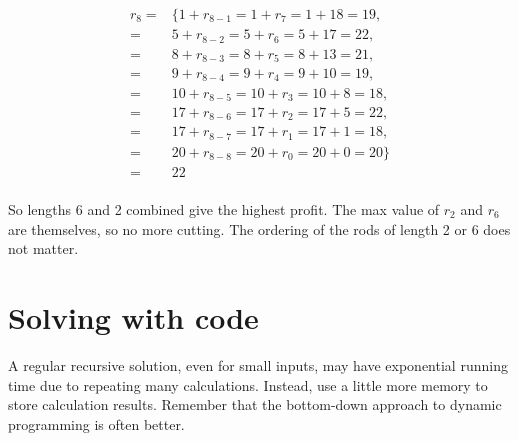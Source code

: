 \documentclass[12pt]{article}
\begin{document}
\begin{equation*} \label{rc8}
\begin{split}
r_8 = & \{ 1+r_{8-1} =1+r_7 = 1+18 =19,\\
    = & 5+r_{8-2} =5+r_6 = 5+17 =22,\\
    = & 8+r_{8-3} =8+r_5 = 8+13 =21,\\
    = & 9+r_{8-4} =9+r_4 = 9+10 =19,\\
    = & 10+r_{8-5}=10+r_3= 10+8 =18,\\
    = & 17+r_{8-6}=17+r_2= 17+5 =22,\\
    = & 17+r_{8-7}=17+r_1= 17+1 =18,\\
    = & 20+r_{8-8}=20+r_0= 20+0 =20 \}\\
    = & 22\\ 
\end{split}
\end{equation*}

So lengths 6 and 2 combined give the highest profit. The max value of $r_2$ and $r_6$ are themselves, so no more cutting. The ordering of the rods of length 2 or 6 does not matter.

\section*{Solving with code}
A regular recursive solution, even for small inputs, may have exponential running time due to repeating many calculations. Instead, use a little more memory to store calculation results. Remember that the bottom-down approach to dynamic programming is often better.
\end{document}
